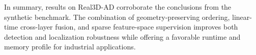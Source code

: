In summary, results on Real3D-AD corroborate the conclusions from the synthetic benchmark. The combination of geometry-preserving ordering, linear-time cross-layer fusion, and sparse feature-space supervision improves both detection and localization robustness while offering a favorable runtime and memory profile for industrial applications.
